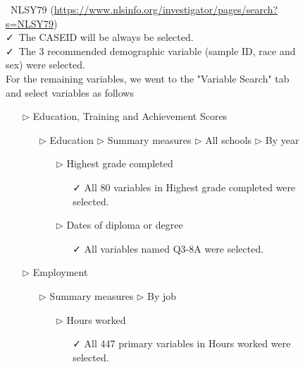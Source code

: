 \documentclass{article}
\begin{document}
\begin{figure}[t]

\begin{tcolorbox}[title = Navigating the data source]
\faDatabase\ NLSY79 (\url{https://www.nlsinfo.org/investigator/pages/search?s=NLSY79})\\
\vspace{1mm}
\faCheck\ The CASEID will be always be selected.  \\
\vspace{1mm}
\faCheck\ The 3 recommended demographic variable (sample ID, race and sex) were selected.  \\
\vspace{1mm}
For the remaining variables, we went to the "Variable Search" tab and select variables as follows
\begin{itemize}
\item[$\triangleright$] Education, Training and Achievement Scores
\begin{itemize}
\item[$\triangleright$] Education $\triangleright$ Summary measures $\triangleright$ All schools $\triangleright$ By year
\begin{itemize}
\item[$\triangleright$] Highest grade completed
\begin{itemize}
\item[\faCheck] All 80 variables in Highest grade completed were selected.
\end{itemize}
\end{itemize}
\begin{itemize}
\item[$\triangleright$] Dates of diploma or degree
\begin{itemize}
\item[\faCheck] All variables named Q3-8A were selected.
\end{itemize}
\end{itemize}
\end{itemize}
\item[$\triangleright$] Employment
\begin{itemize}
\item[$\triangleright$] Summary measures $\triangleright$ By job
\begin{itemize}
\item[$\triangleright$] Hours worked  
\begin{itemize}
\item[\faCheck] All 447 primary variables in Hours worked were selected.

\end{itemize}
\end{itemize}
\end{itemize}
\end{itemize}
\end{tcolorbox}
\end{figure}
\end{document}
